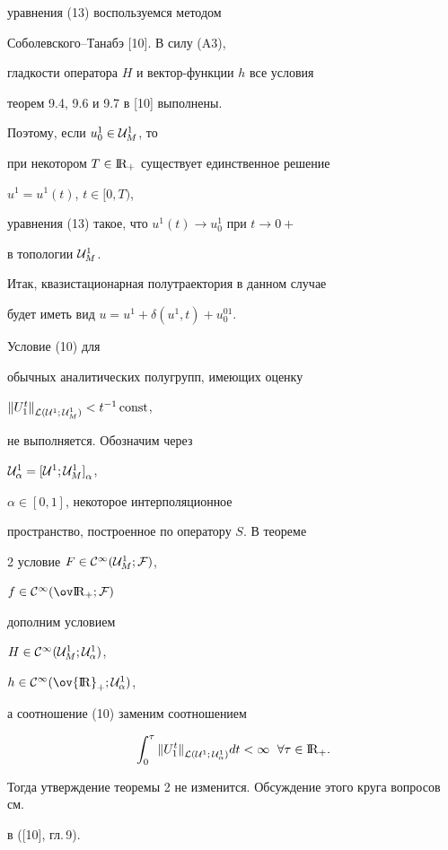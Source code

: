 уравнения (13) воспользуемся методом


Соболевского--Танабэ [10]. В силу (A3),


гладкости оператора $H$ и вектор-функции $h$ все условия


теорем 9.4, 9.6 и 9.7 в [10] выполнены. 


Поэтому, если $u_0^1 \in {\cal U}_M^1$, то


при некотором $T \in {\mathrm I}\!{\mathrm R}_+$ существует единственное решение


$u^1=u^1(t)$, $t \in [0,T)$,


уравнения (13) такое, что $u^1(t) \to u_0^1$ при $t \to 0+$


в топологии ${\cal U}_M^1$.





Итак, квазистационарная полутраектория в данном случае


будет иметь вид $u=u^1+\delta (u^1,t)+u^{01}_0$.





\begin{note}


Условие (10) для


обычных аналитических полугрупп, имеющих оценку\linebreak


${\| U^t_1 \|}_{{\cal L}({\cal U}^1;\, {\cal U}_M^1)}<t^{-1}\operatorname{const}$,


не выполняется. Обозначим через


${\cal U}_{\alpha}^1={[{\cal U}^1; {\cal U}_M^1]}_{\alpha}$,


$\alpha \in [0,1]$, некоторое интерполяционное


пространство, построенное по оператору $S$. В теореме


2 условие $F \in {\cal C}^ \infty({\cal U}_M^1;{\cal F})$,


$f \in {\cal C}^ \infty({\ov \R}_+;{\cal F})$


дополним условием


$H \in {\cal C}^ \infty({\cal U}_M^1;{\cal U}_{\alpha}^1)$,


$h \in {\cal C}^ \infty({\ov {\R}}_+;{\cal U}_{\alpha}^1)$,


а соотношение (10) заменим соотношением


\begin{equation}


\int_0^{\tau} {\| U_1^t \|}_{{\cal L}({\cal U}^1;\,{\cal U}_{\alpha}^1)}


dt< \infty \ \; \forall \tau \in {\R}_+.


\end{equation}


Тогда утверждение теоремы 2 не изменится. Обсуждение этого круга вопросов см.


в ([10], гл.\,9).


\end{note}





